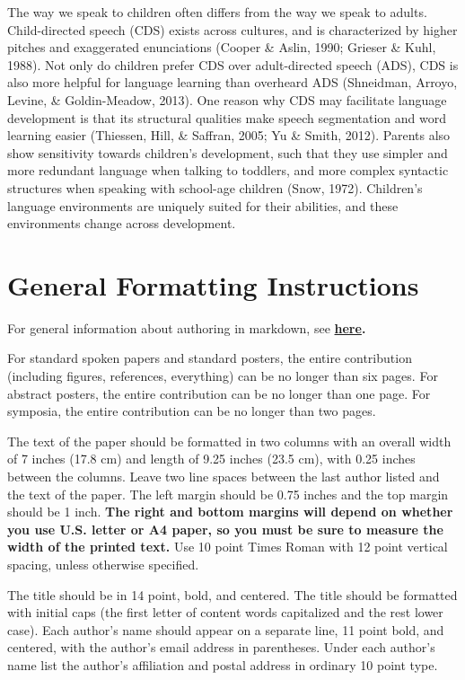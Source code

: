 \documentclass[10pt, letterpaper]{article}
\begin{document}
The way we speak to children often differs from the way we speak to
adults. Child-directed speech (CDS) exists across cultures, and is
characterized by higher pitches and exaggerated enunciations (Cooper \&
Aslin, 1990; Grieser \& Kuhl, 1988). Not only do children prefer CDS
over adult-directed speech (ADS), CDS is also more helpful for language
learning than overheard ADS (Shneidman, Arroyo, Levine, \&
Goldin-Meadow, 2013). One reason why CDS may facilitate language
development is that its structural qualities make speech segmentation
and word learning easier (Thiessen, Hill, \& Saffran, 2005; Yu \& Smith,
2012). Parents also show sensitivity towards children's development,
such that they use simpler and more redundant language when talking to
toddlers, and more complex syntactic structures when speaking with
school-age children (Snow, 1972). Children's language environments are
uniquely suited for their abilities, and these environments change
across development.

\section{General Formatting
Instructions}\label{general-formatting-instructions}

For general information about authoring in markdown, see
\textbf{\href{http://rmarkdown.rstudio.com/authoring_basics.html}{here}.}

For standard spoken papers and standard posters, the entire contribution
(including figures, references, everything) can be no longer than six
pages. For abstract posters, the entire contribution can be no longer
than one page. For symposia, the entire contribution can be no longer
than two pages.

The text of the paper should be formatted in two columns with an overall
width of 7 inches (17.8 cm) and length of 9.25 inches (23.5 cm), with
0.25 inches between the columns. Leave two line spaces between the last
author listed and the text of the paper. The left margin should be 0.75
inches and the top margin should be 1 inch.
\textbf{The right and bottom margins will depend on whether you use
U.S. letter or A4 paper, so you must be sure to measure the width of
the printed text.} Use 10 point Times Roman with 12 point vertical
spacing, unless otherwise specified.

The title should be in 14 point, bold, and centered. The title should be
formatted with initial caps (the first letter of content words
capitalized and the rest lower case). Each author's name should appear
on a separate line, 11 point bold, and centered, with the author's email
address in parentheses. Under each author's name list the author's
affiliation and postal address in ordinary 10 point type.
\end{document}
